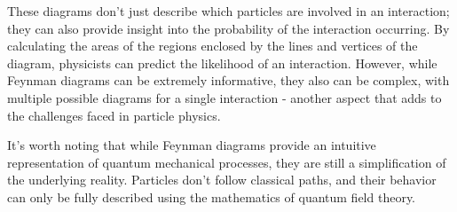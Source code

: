 These diagrams don't just describe which particles are involved in an interaction; they can also provide insight into
the probability of the interaction occurring. By calculating the areas of the regions enclosed by the lines and vertices
of the diagram, physicists can predict the likelihood of an interaction. However, while Feynman diagrams can be
extremely informative, they also can be complex, with multiple possible diagrams for a single interaction - another
aspect that adds to the challenges faced in particle physics.

It's worth noting that while Feynman diagrams provide an intuitive representation of quantum mechanical processes, they
are still a simplification of the underlying reality. Particles don't follow classical paths, and their behavior can
only be fully described using the mathematics of quantum field theory.


